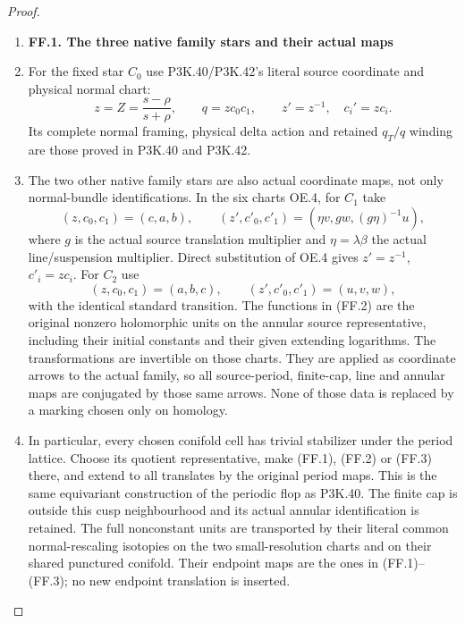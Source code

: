 \begin{proof}
\begin{enumerate}[label=\arabic*.]
\item \par

\medskip\noindent\textbf{FF.1. The three native family stars and their actual maps}

\par\nobreak

\item For the fixed star \(C_0\) use P3K.40/P3K.42's literal source
coordinate and physical normal chart:
\[
 z=Z=\frac{s-\rho}{s+\rho},\qquad
 q=zc_0c_1,\qquad z'=z^{-1},\quad c_i'=zc_i.
                                                               \tag{FF.1}
\]
Its complete normal framing, physical delta action and retained
\(q_T/q\) winding are those proved in P3K.40 and P3K.42.

\item The two other native family stars are also actual coordinate maps,
not only normal-bundle identifications. In the six charts OE.4,
for \(C_1\) take
\[
 (z,c_0,c_1)=(c,a,b),\qquad
 (z',c'_0,c'_1)=(\eta v,g w,(g\eta)^{-1}u),           \tag{FF.2}
\]
where \(g\) is the actual source translation multiplier and
\(\eta=\lambda\beta\) the actual line/suspension multiplier.
Direct substitution of OE.4 gives
\(z'=z^{-1}\), \(c'_i=zc_i\). For \(C_2\) use
\[
 (z,c_0,c_1)=(a,b,c),\qquad (z',c'_0,c'_1)=(u,v,w),  \tag{FF.3}
\]
with the identical standard transition. The functions in (FF.2)
are the original nonzero holomorphic units on the annular source
representative, including their initial constants and their given
extending logarithms. The transformations are invertible on those
charts. They are applied as coordinate arrows to the actual family,
so all source-period, finite-cap, line and annular maps are conjugated
by those same arrows. None of those data is replaced by a marking
chosen only on homology.

\item In particular, every chosen conifold cell has trivial stabilizer
under the period lattice. Choose its quotient representative,
make (FF.1), (FF.2) or (FF.3) there, and extend to all translates by
the original period maps. This is the same equivariant construction
of the periodic flop as P3K.40. The finite cap is outside this cusp
neighbourhood and its actual annular identification is retained.
The full nonconstant units are transported by their literal common
normal-rescaling isotopies on the two small-resolution charts and
on their shared punctured conifold. Their endpoint maps are the
ones in (FF.1)--(FF.3); no new endpoint translation is inserted.


\end{enumerate}
\end{proof}
